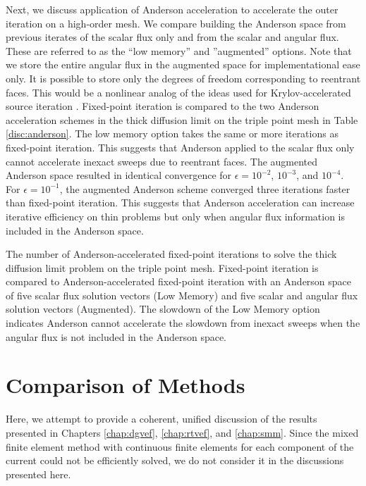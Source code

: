 \documentclass[../doc.tex]{subfiles}
\begin{document}
Next, we discuss application of Anderson acceleration to accelerate the outer iteration on a high-order mesh. We compare building the Anderson space from previous iterates of the scalar flux only and from the scalar and angular flux. These are referred to as the ``low memory'' and ''augmented'' options. Note that we store the entire angular flux in the augmented space for implementational ease only. It is possible to store only the degrees of freedom corresponding to reentrant faces. This would be a nonlinear analog of the ideas used for Krylov-accelerated source iteration \cite{doi:10.13182/NSE02-14}. Fixed-point iteration is compared to the two Anderson acceleration schemes in the thick diffusion limit on the triple point mesh in Table \ref{disc:anderson}. The low memory option takes the same or more iterations as fixed-point iteration. This suggests that Anderson applied to the scalar flux only cannot accelerate inexact sweeps due to reentrant faces. The augmented Anderson space resulted in identical convergence for $\epsilon = 10^{-2}$, $10^{-3}$, and $10^{-4}$. For $\epsilon=10^{-1}$, the augmented Anderson scheme converged three iterations faster than fixed-point iteration. This suggests that Anderson acceleration can increase iterative efficiency on thin problems but only when angular flux information is included in the Anderson space. 

\begin{table}
\centering
\caption{The number of Anderson-accelerated fixed-point iterations to solve the thick diffusion limit problem on the triple point mesh. Fixed-point iteration is compared to Anderson-accelerated fixed-point iteration with an Anderson space of five scalar flux solution vectors (Low Memory) and five scalar and angular flux solution vectors (Augmented). The slowdown of the Low Memory option indicates Anderson cannot accelerate the slowdown from inexact sweeps when the angular flux is not included in the Anderson space. }
\label{disc:anderson}

\end{table}

\section{Comparison of Methods}
Here, we attempt to provide a coherent, unified discussion of the results presented in Chapters \ref{chap:dgvef}, \ref{chap:rtvef}, and \ref{chap:smm}. Since the mixed finite element method with continuous finite elements for each component of the current could not be efficiently solved, we do not consider it in the discussions presented here. 
\end{document}
